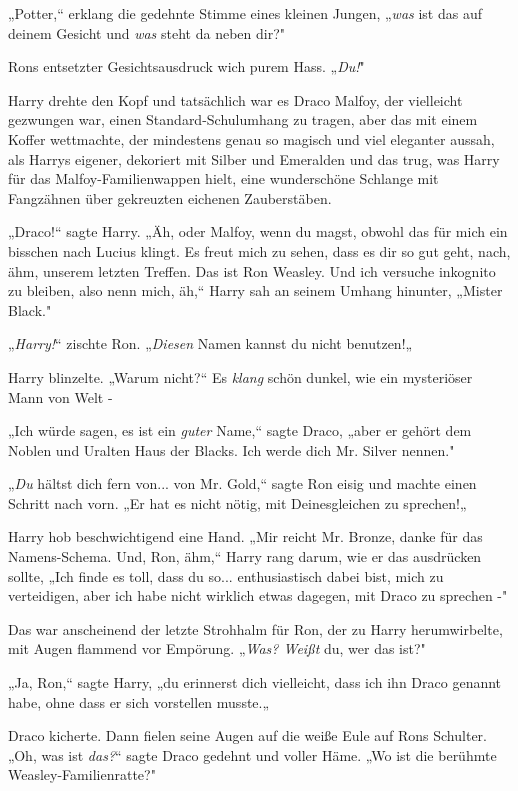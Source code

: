 {„Potter,“ erklang die gedehnte Stimme eines kleinen Jungen, „\emph{was} ist das auf deinem Gesicht und \emph{was} steht da neben dir?"

Rons entsetzter Gesichtsausdruck wich purem Hass. „\emph{Du!}"

Harry drehte den Kopf und tatsächlich war es Draco Malfoy, der vielleicht gezwungen war, einen Standard-Schulumhang zu tragen, aber das mit einem Koffer wettmachte, der mindestens genau so magisch und viel eleganter aussah, als Harrys eigener, dekoriert mit Silber und Emeralden und das trug, was Harry für das Malfoy-Familienwappen hielt, eine wunderschöne Schlange mit Fangzähnen über gekreuzten eichenen Zauberstäben.

„Draco!“ sagte Harry. „Äh, oder Malfoy, wenn du magst, obwohl das für mich ein bisschen nach Lucius klingt. Es freut mich zu sehen, dass es dir so gut geht, nach, ähm, unserem letzten Treffen. Das ist Ron Weasley. Und ich versuche inkognito zu bleiben, also nenn mich, äh,“ Harry sah an seinem Umhang hinunter, „Mister Black."

„\emph{Harry!}“ zischte Ron. „\emph{Diesen} Namen kannst du nicht benutzen!„

Harry blinzelte. „Warum nicht?“ Es \emph{klang} schön dunkel, wie ein mysteriöser Mann von Welt -

„Ich würde sagen, es ist ein \emph{guter} Name,“ sagte Draco, „aber er gehört dem Noblen und Uralten Haus der Blacks. Ich werde dich Mr. Silver nennen."

„\emph{Du} hältst dich fern von... von Mr. Gold,“ sagte Ron eisig und machte einen Schritt nach vorn. „Er hat es nicht nötig, mit Deinesgleichen zu sprechen!„

Harry hob beschwichtigend eine Hand. „Mir reicht Mr. Bronze, danke für das Namens-Schema. Und, Ron, ähm,“ Harry rang darum, wie er das ausdrücken sollte, „Ich finde es toll, dass du so... enthusiastisch dabei bist, mich zu verteidigen, aber ich habe nicht wirklich etwas dagegen, mit Draco zu sprechen -"

Das war anscheinend der letzte Strohhalm für Ron, der zu Harry herumwirbelte, mit Augen flammend vor Empörung. „\emph{Was? Weißt} du, wer das ist?"

„Ja, Ron,“ sagte Harry, „du erinnerst dich vielleicht, dass ich ihn Draco genannt habe, ohne dass er sich vorstellen musste.„

Draco kicherte. Dann fielen seine Augen auf die weiße Eule auf Rons Schulter. „Oh, was ist \emph{das?}“ sagte Draco gedehnt und voller Häme. „Wo ist die berühmte Weasley-Familienratte?"

}
